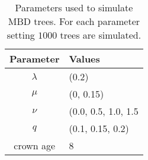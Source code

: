 \begin{table}[ht]
  \centering
  \begin{tabular}{ | c | l | }
    \hline
    \textbf{Parameter} &
    \textbf{Values} \\ 
    \hline
    $\lambda$ & (0.2) \\
    $\mu$ & (0, 0.15) \\
    $\nu$ & (0.0, 0.5, 1.0, 1.5 \\
    $q$ & (0.1, 0.15, 0.2) \\
    crown age & 8 \\
    \hline
  \end{tabular}
  \caption{
    Parameters used to simulate MBD trees. For each parameter setting $1000$ trees are simulated.
  }
  \label{tab:simulation_parameters}
\end{table}